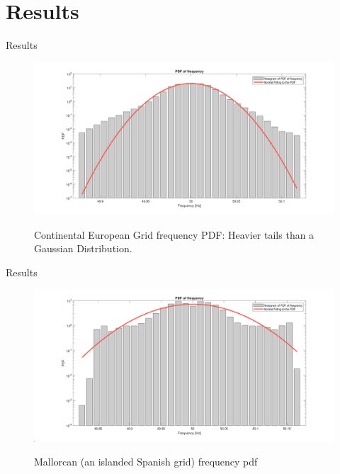 \section[Results]{Results}
\label{sec:results}

\begin{frame}{Results}
	\begin{figure}
		\centering
		\includegraphics[scale=0.15]{figures/pdf/pdf_frequency_rte_2019_09.png}
		\label{fig:pdf_rte2019}
		\caption{Continental European Grid frequency PDF: Heavier tails than a Gaussian Distribution.}
	\end{figure}
\end{frame}

\begin{frame}{Results}
	\begin{figure}
		\centering
		\includegraphics[scale=0.15]{../figures/pdf/pdf_frequency_spain_mallorca_2019_05_f1}
		\label{fig:pdf_spainMallorca}
		\caption{Mallorcan (an islanded Spanish grid) frequency pdf}
	\end{figure}
\end{frame}

